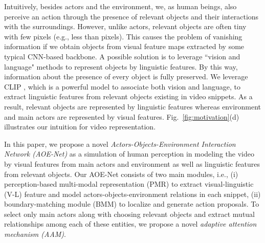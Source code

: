 \documentclass[sn-mathphys]{sn-jnl}
\theoremstyle{thmstyleone}\newtheorem{theorem}{Theorem}\newtheorem{proposition}[theorem]{Proposition}
\theoremstyle{thmstyletwo}\newtheorem{example}{Example}\newtheorem{remark}{Remark}
\theoremstyle{thmstylethree}\newtheorem{definition}{Definition}
\begin{document}
Intuitively, besides actors and the environment, we, as human beings, also perceive an action through the presence of relevant objects and their interactions with the surroundings.
However, unlike actors, relevant objects are often tiny with few pixels (e.g., less than  pixels). This causes the problem of vanishing information if we obtain objects from visual feature maps extracted by some typical CNN-based backbone. A possible solution is to leverage ``vision and language" methods \cite{mei2020vision, anderson2018bottom, radford2021learning} to represent objects by linguistic features. By this way, information about the presence of every object is fully preserved. We leverage CLIP \cite{radford2021learning}, which is a powerful model to associate both vision and language, to extract linguistic features from relevant objects existing in video snippets. As a result, relevant objects are represented by linguistic features whereas environment and main actors are represented by visual features. Fig.~\ref{fig:motivation}(d) illustrates our intuition for video representation.  




In this paper, we propose a novel \emph{Actors-Objects-Environment Interaction Network (AOE-Net)} as a simulation of human perception in modeling the video by visual features from main actors and environment as well as linguistic features from relevant objects. Our AOE-Net consists of two main modules, i.e., (i) perception-based multi-modal representation (PMR) to extract visual-linguistic (V-L) feature and model actors-objects-environment relations in each snippet, (ii) boundary-matching module (BMM) to localize and generate action proposals. To select only main actors along with choosing relevant objects and extract mutual relationships among each of these entities, we propose a novel \emph{adaptive attention mechanism (AAM)}.
\end{document}
